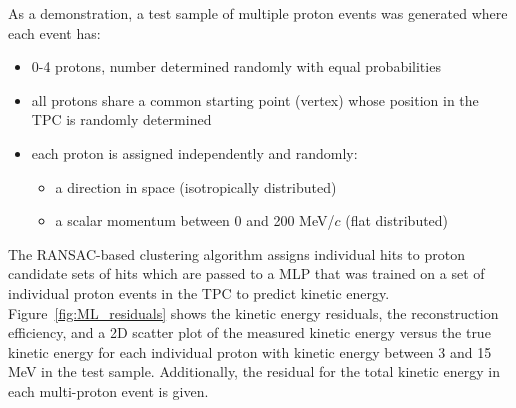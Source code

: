 As a demonstration, a test sample of multiple proton events was generated where each event has:
\begin{itemize}
\item 0-4 protons, number determined randomly with equal probabilities
\item all protons share a common starting point (vertex) whose position in the TPC is randomly determined
\item each proton is assigned independently and randomly:
\begin{itemize}
\item a direction in space (isotropically distributed)
\item a scalar momentum between 0 and 200 MeV/$c$ (flat distributed)
\end{itemize}
\end{itemize}

The RANSAC-based clustering algorithm assigns individual hits to proton candidate sets of hits which are
passed to a MLP that was trained on a set of individual proton events in the TPC to predict kinetic energy.  Figure~\ref{fig:ML_residuals} shows the kinetic energy residuals, the reconstruction efficiency,
and a 2D scatter plot of the measured kinetic energy versus the true kinetic energy
for each individual proton with kinetic energy between 3 and 15 MeV in the test sample.  Additionally, the residual for the total kinetic energy in each multi-proton event is given. 

